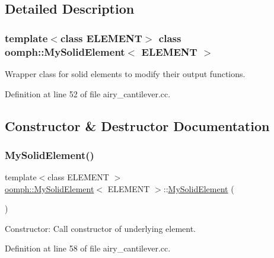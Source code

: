\subsection{Detailed Description}
\subsubsection*{template$<$class E\+L\+E\+M\+E\+NT$>$\newline
class oomph\+::\+My\+Solid\+Element$<$ E\+L\+E\+M\+E\+N\+T $>$}

Wrapper class for solid elements to modify their output functions. 

Definition at line 52 of file airy\+\_\+cantilever.\+cc.



\subsection{Constructor \& Destructor Documentation}
\mbox{\label{classoomph_1_1MySolidElement_afe8a392ac0bed5890f64b75adea8f5af}} 
\subsubsection{\texorpdfstring{My\+Solid\+Element()}{MySolidElement()}\hspace{0.1cm}{\footnotesize\ttfamily [1/2]}}
{\footnotesize\ttfamily template$<$class E\+L\+E\+M\+E\+NT $>$ \\
\hyperlink{classoomph_1_1MySolidElement}{oomph\+::\+My\+Solid\+Element}$<$ E\+L\+E\+M\+E\+NT $>$\+::\hyperlink{classoomph_1_1MySolidElement}{My\+Solid\+Element} (\begin{DoxyParamCaption}{ }\end{DoxyParamCaption})\hspace{0.3cm}{\ttfamily [inline]}}



Constructor\+: Call constructor of underlying element. 



Definition at line 58 of file airy\+\_\+cantilever.\+cc.

\mbox{\label{classoomph_1_1MySolidElement_afe8a392ac0bed5890f64b75adea8f5af}} 
